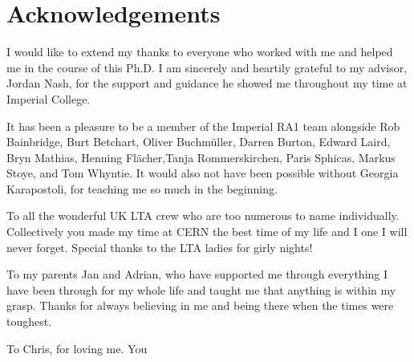 \chapter*{Acknowledgements}


\normalsize

I would like to extend my thanks to everyone who worked with me and helped me in the course of this Ph.D. I am sincerely and heartily grateful to my advisor, Jordan Nash, for the support and guidance he showed me throughout my time at Imperial College.

It has been a pleasure to be a member of the Imperial RA1 team alongside Rob Bainbridge, Burt Betchart, Oliver Buchm\"uller, Darren Burton, Edward Laird, Bryn Mathias, Henning Fl\"acher,Tanja Rommerskirchen, Paris Sphicas, Markus Stoye, and Tom Whyntie. It would also not have been possible without Georgia Karapostoli, for teaching me so much in the beginning. 



To all the wonderful UK LTA crew who are too numerous to name individually. Collectively you made my time at CERN the best time of my life and I one I will never forget. Special thanks to the LTA ladies for girly nights! 

To my parents Jan and Adrian, who have supported me through everything I have been through for my whole life and taught me that anything is within my grasp. Thanks for always believing in me and being there when the times were toughest. 

To Chris, for loving me. You 

